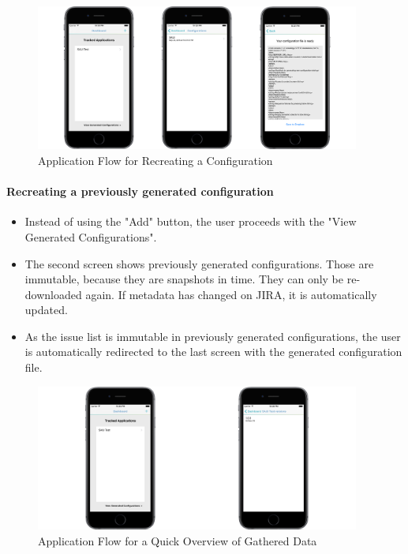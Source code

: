 \newpage

\begin{figure}[!ht]
	\centering
	\includegraphics[width=0.95\textwidth]{figures/04_implementation/reconfig_flow}
    \caption{Application Flow for Recreating a Configuration}
\end{figure}

\paragraph{Recreating a previously generated configuration}

\begin{itemize}
	\item Instead of using the "Add" button, the user proceeds with the "View Generated Configurations".
	\item The second screen shows previously generated configurations. Those are immutable, because they are snapshots in time. They can only be re-downloaded again. If metadata has changed on JIRA, it is automatically updated.
	\item As the issue list is immutable in previously generated configurations, the user is automatically redirected to the last screen with the generated configuration file.
\end{itemize}

\begin{figure}[!ht]
	\centering
	\includegraphics[width=0.95\textwidth]{figures/04_implementation/quick_summary}
    \caption{Application Flow for a Quick Overview of Gathered Data}
\end{figure}

